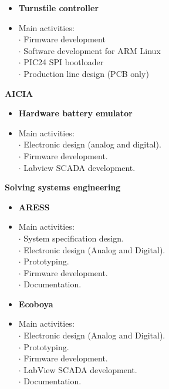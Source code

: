 \documentclass[9pt]{extarticle}
\begin{document}
\begin{itemize}
\item[\textbf{}]{\textbf{Turnstile controller}}
\item[\textbf{}]{Main activities:}\\
$\cdot${ Firmware development}\\
$\cdot${ Software development for ARM Linux}\\
$\cdot${ PIC24 SPI bootloader}\\
$\cdot${ Production line design (PCB only)}\\
\end{itemize}


\textbf{AICIA}\\
\begin{itemize}
\item[\textbf{}]{\textbf{Hardware battery emulator}}
\item[\textbf{}]{Main activities:}\\
$\cdot${ Electronic design (analog and digital).}\\
$\cdot${ Firmware development.}\\
$\cdot${ Labview SCADA development.}\\
\end{itemize}


\textbf{Solving systems engineering}\\
\begin{itemize}
\item[\textbf{}]{\textbf{ARESS}}
\item[\textbf{}]{Main activities:}\\
$\cdot${ System specification design.}\\
$\cdot${ Electronic design (Analog and Digital).}\\
$\cdot${ Prototyping.}\\
$\cdot${ Firmware development.}\\
$\cdot${ Documentation.}\\
\end{itemize}

\begin{itemize}
\item[\textbf{}]{\textbf{Ecoboya}}
\item[\textbf{}]{Main activities:}\\
$\cdot${ Electronic design (Analog and Digital).}\\
$\cdot${ Prototyping.}\\
$\cdot${ Firmware development.}\\
$\cdot${ LabView SCADA development.}\\
$\cdot${ Documentation.}\\
\end{itemize}
\end{document}
